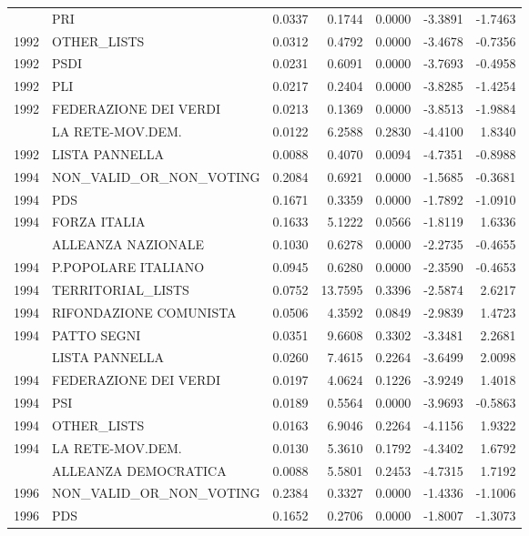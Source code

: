 \begin{longtable}[t]{rlrrrrr}
\addlinespace
1992 & PRI & 0.0337 & 0.1744 & 0.0000 & -3.3891 & -1.7463\\
1992 & OTHER\_LISTS & 0.0312 & 0.4792 & 0.0000 & -3.4678 & -0.7356\\
1992 & PSDI & 0.0231 & 0.6091 & 0.0000 & -3.7693 & -0.4958\\
1992 & PLI & 0.0217 & 0.2404 & 0.0000 & -3.8285 & -1.4254\\
1992 & FEDERAZIONE DEI VERDI & 0.0213 & 0.1369 & 0.0000 & -3.8513 & -1.9884\\
\addlinespace
1992 & LA RETE-MOV.DEM. & 0.0122 & 6.2588 & 0.2830 & -4.4100 & 1.8340\\
1992 & LISTA PANNELLA & 0.0088 & 0.4070 & 0.0094 & -4.7351 & -0.8988\\
1994 & NON\_VALID\_OR\_NON\_VOTING & 0.2084 & 0.6921 & 0.0000 & -1.5685 & -0.3681\\
1994 & PDS & 0.1671 & 0.3359 & 0.0000 & -1.7892 & -1.0910\\
1994 & FORZA ITALIA & 0.1633 & 5.1222 & 0.0566 & -1.8119 & 1.6336\\
\addlinespace
1994 & ALLEANZA NAZIONALE & 0.1030 & 0.6278 & 0.0000 & -2.2735 & -0.4655\\
1994 & P.POPOLARE ITALIANO & 0.0945 & 0.6280 & 0.0000 & -2.3590 & -0.4653\\
1994 & TERRITORIAL\_LISTS & 0.0752 & 13.7595 & 0.3396 & -2.5874 & 2.6217\\
1994 & RIFONDAZIONE COMUNISTA & 0.0506 & 4.3592 & 0.0849 & -2.9839 & 1.4723\\
1994 & PATTO SEGNI & 0.0351 & 9.6608 & 0.3302 & -3.3481 & 2.2681\\
\addlinespace
1994 & LISTA PANNELLA & 0.0260 & 7.4615 & 0.2264 & -3.6499 & 2.0098\\
1994 & FEDERAZIONE DEI VERDI & 0.0197 & 4.0624 & 0.1226 & -3.9249 & 1.4018\\
1994 & PSI & 0.0189 & 0.5564 & 0.0000 & -3.9693 & -0.5863\\
1994 & OTHER\_LISTS & 0.0163 & 6.9046 & 0.2264 & -4.1156 & 1.9322\\
1994 & LA RETE-MOV.DEM. & 0.0130 & 5.3610 & 0.1792 & -4.3402 & 1.6792\\
\addlinespace
1994 & ALLEANZA DEMOCRATICA & 0.0088 & 5.5801 & 0.2453 & -4.7315 & 1.7192\\
1996 & NON\_VALID\_OR\_NON\_VOTING & 0.2384 & 0.3327 & 0.0000 & -1.4336 & -1.1006\\
1996 & PDS & 0.1652 & 0.2706 & 0.0000 & -1.8007 & -1.3073\\

\end{longtable}
